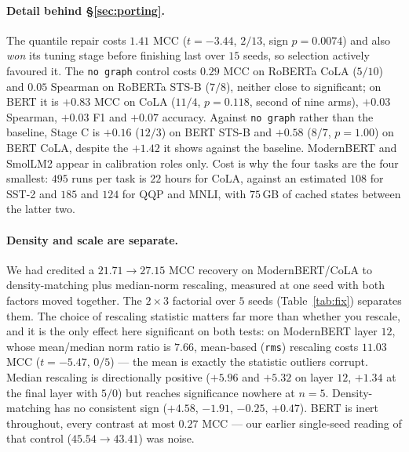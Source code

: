 \documentclass{article}
\begin{document}
\paragraph{Detail behind \S\ref{sec:porting}.} The quantile repair costs $1.41$
MCC ($t=-3.44$, $2/13$, sign $p=0.0074$) and also \emph{won} its tuning stage
before finishing last over $15$ seeds, so selection actively favoured it. The
\texttt{no graph} control costs $0.29$ MCC on RoBERTa CoLA ($5/10$) and $0.05$
Spearman on RoBERTa STS-B ($7/8$), neither close to significant; on BERT it is
$+0.83$ MCC on CoLA ($11/4$, $p=0.118$, second of nine arms), $+0.03$ Spearman,
$+0.03$ F1 and $+0.07$ accuracy. Against \texttt{no graph} rather than the
baseline, Stage C is $+0.16$ ($12/3$) on BERT STS-B and $+0.58$ ($8/7$,
$p=1.00$) on BERT CoLA, despite the $+1.42$ it shows against the baseline.
ModernBERT \citep{warner2024modernbert} and SmolLM2 \citep{benallal2025smollm2}
appear in calibration roles only. Cost is why the four tasks are the four
smallest: $495$ runs per task is $22$ hours for CoLA, against an estimated $108$
for SST-2 and $185$ and $124$ for QQP and MNLI, with $75$\,GB of cached states
between the latter two.

\paragraph{Density and scale are separate.} We had credited a $21.71 \rightarrow
27.15$ MCC recovery on ModernBERT/CoLA to density-matching plus median-norm
rescaling, measured at one seed with both factors moved together. The
$2\times3$ factorial over $5$ seeds (Table~\ref{tab:fix}) separates them. The
choice of rescaling statistic matters far more than whether you rescale, and it
is the only effect here significant on both tests: on ModernBERT layer $12$,
whose mean/median norm ratio is $7.66$, mean-based (\texttt{rms}) rescaling
costs $11.03$ MCC ($t=-5.47$, $0/5$) --- the mean is exactly the statistic
outliers corrupt. Median rescaling is directionally positive ($+5.96$ and
$+5.32$ on layer $12$, $+1.34$ at the final layer with $5/0$) but reaches
significance nowhere at $n=5$. Density-matching has no consistent sign
($+4.58$, $-1.91$, $-0.25$, $+0.47$). BERT is inert throughout, every contrast
at most $0.27$ MCC --- our earlier single-seed reading of that control
($45.54 \rightarrow 43.41$) was noise.
\end{document}
